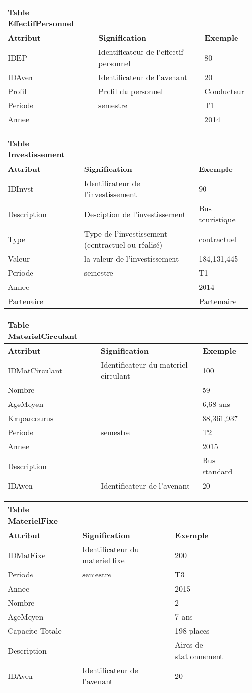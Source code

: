 \documentclass[
]{article}
\begin{document}
\begin{enumerate}
\begin{itemize}
    \begin{longtable}[]{@{}lll@{}}
    \toprule
    Table EffectifPersonnel & &\tabularnewline
    \midrule
    \endhead
    \textbf{Attribut} & \textbf{Signification} &
    \textbf{Exemple}\tabularnewline
    IDEP & Identificateur de l'effectif personnel & 80\tabularnewline
    IDAven & Identificateur de l'avenant & 20\tabularnewline
    Profil & Profil du personnel & Conducteur\tabularnewline
    Periode & semestre & T1\tabularnewline
    Annee & & 2014\tabularnewline
    \bottomrule
    \end{longtable}

    \begin{longtable}[]{@{}lll@{}}
    \toprule
    Table Investissement & &\tabularnewline
    \midrule
    \endhead
    \textbf{Attribut} & \textbf{Signification} &
    \textbf{Exemple}\tabularnewline
    IDInvst & Identificateur de l'investissement & 90\tabularnewline
    Description & Desciption de l'investissement & Bus
    touristique\tabularnewline
    Type & Type de l'investissement (contractuel ou réalisé) &
    contractuel\tabularnewline
    Valeur & la valeur de l'investissement & 184,131,445\tabularnewline
    Periode & semestre & T1\tabularnewline
    Annee & & 2014\tabularnewline
    Partenaire & & Partemaire\tabularnewline
    \bottomrule
    \end{longtable}

    \begin{longtable}[]{@{}lll@{}}
    \toprule
    Table MaterielCirculant & &\tabularnewline
    \midrule
    \endhead
    \textbf{Attribut} & \textbf{Signification} &
    \textbf{Exemple}\tabularnewline
    IDMatCirculant & Identificateur du materiel circulant &
    100\tabularnewline
    Nombre & & 59\tabularnewline
    AgeMoyen & & 6,68 ans\tabularnewline
    Kmparcourus & & 88,361,937\tabularnewline
    Periode & semestre & T2\tabularnewline
    Annee & & 2015\tabularnewline
    Description & & Bus standard\tabularnewline
    IDAven & Identificateur de l'avenant & 20\tabularnewline
    \bottomrule
    \end{longtable}

    \begin{longtable}[]{@{}lll@{}}
    \toprule
    Table MaterielFixe & &\tabularnewline
    \midrule
    \endhead
    \textbf{Attribut} & \textbf{Signification} &
    \textbf{Exemple}\tabularnewline
    IDMatFixe & Identificateur du materiel fixe & 200\tabularnewline
    Periode & semestre & T3\tabularnewline
    Annee & & 2015\tabularnewline
    Nombre & & 2\tabularnewline
    AgeMoyen & & 7 ans\tabularnewline
    Capacite Totale & & 198 places\tabularnewline
    Description & & Aires de stationnement\tabularnewline
    IDAven & Identificateur de l'avenant & 20\tabularnewline
    \bottomrule
    \end{longtable}


\end{itemize}
\end{enumerate}
\end{document}
